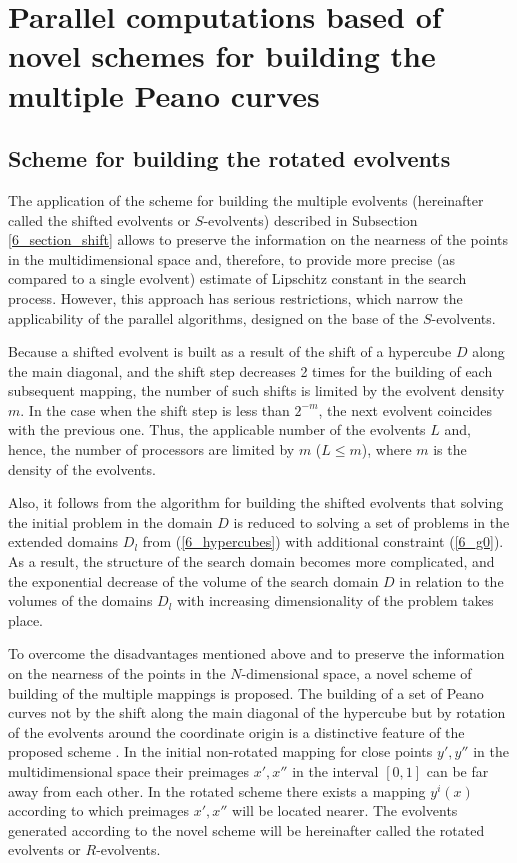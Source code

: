 \section{Parallel computations based of novel schemes for building the multiple Peano curves}
\subsection{Scheme for building the rotated evolvents}

The application of the scheme for building the multiple evolvents (hereinafter called the shifted evolvents or $S$-evolvents) described in Subsection \ref{6_section_shift} allows to preserve the information on the nearness of the points in the multidimensional space and, therefore, to provide more precise (as compared to a single evolvent) estimate of Lipschitz constant in the search process. However, this approach has serious restrictions, which narrow the applicability of the parallel algorithms, designed on the base of the $S$-evolvents.

Because a shifted evolvent is built as a result of the shift of a hypercube $D$ along the main diagonal, and the shift step decreases 2 times for the building of each subsequent mapping, the number of such shifts is limited by the evolvent density $m$. In the case when the shift step is less than $2^{-m}$, the next evolvent coincides with the previous one. Thus, the applicable number of the evolvents $L$ and, hence, the number of processors are limited by $m$ ($L\leq m$), where $m$ is the density of the evolvents.

Also, it follows from the algorithm for building the shifted evolvents that solving the initial problem in the domain $D$ is reduced to solving a set of problems in the extended domains $D_l$ from (\ref{6_hypercubes}) with additional constraint (\ref{6_g0}). As a result, the structure of the search domain becomes more complicated, and the exponential decrease of the volume of the search domain $D$ in relation to the volumes of the domains $D_l$ with increasing dimensionality of the problem takes place.

To overcome the disadvantages mentioned above and to preserve the information on the nearness of the points in the $N$-dimensional space, a novel scheme of building of the multiple mappings is proposed. The building of a set of Peano curves not by the shift along the main diagonal of the hypercube but by rotation of the evolvents around the coordinate origin is a distinctive feature of the proposed scheme \cite{6_Gergel2009}. In the initial non-rotated mapping for close points $y', y''$ in the multidimensional space their preimages  $x', x''$ in the interval $[0,1]$ can be far away from each other. In the rotated scheme there exists a mapping $y^i(x)$ according to which preimages $x', x''$ will be located nearer. The evolvents generated according to the novel scheme will be hereinafter called the rotated evolvents or $R$-evolvents.

